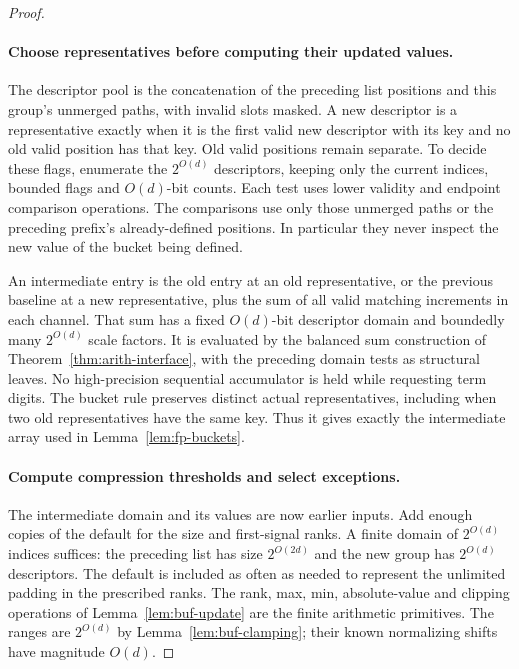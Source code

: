 \documentclass[11pt]{article}
\numberwithin{equation}{section}
\theoremstyle{definition}
\theoremstyle{remark}
\begin{document}
\begin{proof}
\paragraph{Choose representatives before computing their updated values.}
The descriptor pool is the concatenation of the preceding list positions
and this group's unmerged paths, with invalid slots masked.  A new
descriptor is a representative exactly when it is the first valid
new descriptor with its key and no old valid position has that key.
Old valid positions remain separate.  To decide these flags, enumerate
the $2^{O(d)}$ descriptors, keeping only the current indices, bounded
flags and $O(d)$-bit counts.  Each test uses lower validity and endpoint
comparison operations.  The comparisons use only those unmerged paths
or the preceding prefix's already-defined positions.  In particular
they never inspect the new value of the bucket being defined.

An intermediate entry is the old entry at an old representative, or
the previous baseline at a new representative, plus the sum of all
valid matching increments in each channel.  That sum has a fixed
$O(d)$-bit descriptor domain and boundedly many $2^{O(d)}$ scale
factors.  It is evaluated by the balanced sum construction of
Theorem~\ref{thm:arith-interface}, with the preceding domain tests as
structural leaves.  No high-precision sequential accumulator is held
while requesting term digits.  The bucket rule preserves distinct
actual representatives, including when two old representatives have
the same key.  Thus it gives exactly the intermediate array used in
Lemma~\ref{lem:fp-buckets}.

\begingroup
{}
\paragraph{Compute compression thresholds and select exceptions.}
The intermediate domain and its values are now earlier inputs.  Add
enough copies of the default for the size and first-signal ranks.  A
finite domain of $2^{O(d)}$ indices suffices: the preceding list has
size $2^{O(2d)}$ and the new group has $2^{O(d)}$ descriptors.  The
default is included as often as needed to represent the unlimited
padding in the prescribed ranks.  The rank, max, min, absolute-value
and clipping operations of Lemma~\ref{lem:buf-update} are the finite
arithmetic primitives.  The ranges are $2^{O(d)}$ by
Lemma~\ref{lem:buf-clamping}; their known normalizing shifts have
magnitude $O(d)$.
\par\endgroup


\end{proof}
\end{document}
